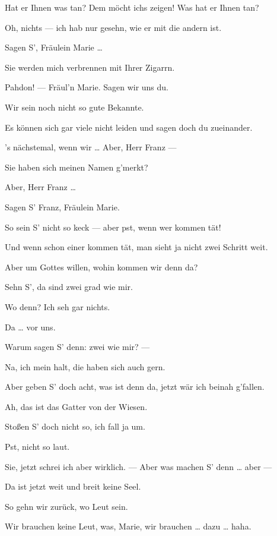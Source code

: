 \documentclass[
	final,
	a4paper,
	ngerman,
	mpinclude = true, %
	twoside = true,
	open = right,
	cleardoublepage = plain,
	DIV = 13,
	BCOR = 1cm,
	titlepage = firstiscover,
	]{scrbook}
\newcommand{\thecharacter}[1]{\textup{\textsc{#1}}\xspace}
\newcommand{\thesoldat}{\thecharacter{Soldatin}}
\newcommand{\themaedchen}{\thecharacter{Praktikant}}
\newcommand{\character}[1]{\item[#1:]}
\newcommand{\soldat}{\character{\thesoldat}}
\newcommand{\maedchen}{\character{\themaedchen}}
\begin{document}
\begin{play}
	\soldat
	Hat er Ihnen was tan? Dem möcht ichs zeigen! Was hat er Ihnen tan?

	\maedchen
	Oh, nichts --- ich hab nur gesehn, wie er mit die andern ist.

	\soldat
	Sagen S', Fräulein Marie \ldots{}

	\maedchen
	Sie werden mich verbrennen mit Ihrer Zigarrn.

	\soldat
	Pahdon! --- Fräul'n Marie. Sagen wir uns du.

	\maedchen
	Wir sein noch nicht so gute Bekannte.

	\soldat
	Es können sich gar viele nicht leiden und sagen doch du zueinander.

	\maedchen
	's nächstemal, wenn wir \ldots{} Aber, Herr Franz ---

	\soldat
	Sie haben sich meinen Namen g'merkt?

	\maedchen
	Aber, Herr Franz \ldots{}

	\soldat
	Sagen S' Franz, Fräulein Marie.

	\maedchen
	So sein S' nicht so keck --- aber pst, wenn wer kommen tät!

	\soldat
	Und wenn schon einer kommen tät, man sieht ja nicht zwei Schritt weit.

	\maedchen
	Aber um Gottes willen, wohin kommen wir denn da?

	\soldat
	Sehn S', da sind zwei grad wie mir.

	\maedchen
	Wo denn? Ich seh gar nichts.

	\soldat
	Da \ldots{} vor uns.

	\maedchen
	Warum sagen S' denn: zwei wie mir? ---

	\soldat
	Na, ich mein halt, die haben sich auch gern.

	\maedchen
	Aber geben S' doch acht, was ist denn da, jetzt wär ich beinah g'fallen.

	\soldat
	Ah, das ist das Gatter von der Wiesen.

	\maedchen
	Stoßen S' doch nicht so, ich fall ja um.

	\soldat
	Pst, nicht so laut.

	\maedchen
	Sie, jetzt schrei ich aber wirklich. --- Aber was machen S' denn \ldots{} aber ---

	\soldat
	Da ist jetzt weit und breit keine Seel.

	\maedchen
	So gehn wir zurück, wo Leut sein.

	\soldat
	Wir brauchen keine Leut, was, Marie, wir brauchen \ldots{} dazu \ldots{} haha.


\end{play}
\end{document}
